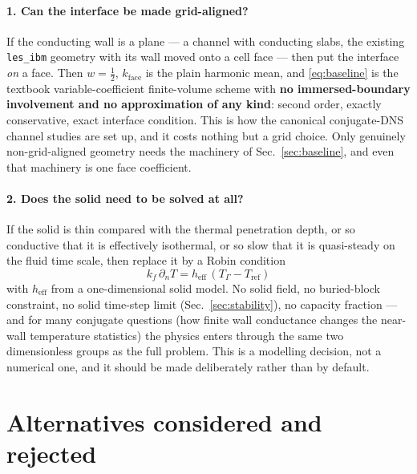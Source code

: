 \documentclass[11pt,a4paper]{article}
\newcommand{\code}[1]{\texttt{#1}}
\begin{document}
\paragraph{1. Can the interface be made grid-aligned?}
If the conducting wall is a plane --- a channel with conducting slabs, the
existing \code{les\_ibm} geometry with its wall moved onto a cell face --- then
put the interface \emph{on} a face. Then $w=\tfrac12$, $k_{\text{face}}$ is the
plain harmonic mean, and \eqref{eq:baseline} is the textbook variable-coefficient
finite-volume scheme with \textbf{no immersed-boundary involvement and no
approximation of any kind}: second order, exactly conservative, exact interface
condition. This is how the canonical conjugate-DNS channel studies are set up,
and it costs nothing but a grid choice. Only genuinely non-grid-aligned geometry
needs the machinery of Sec.~\ref{sec:baseline}, and even that machinery is one
face coefficient.

\paragraph{2. Does the solid need to be solved at all?}
If the solid is thin compared with the thermal penetration depth, or so
conductive that it is effectively isothermal, or so slow that it is quasi-steady
on the fluid time scale, then replace it by a Robin condition
\begin{equation}
  k_f\,\partial_nT = h_{\text{eff}}\,(T_\Gamma-T_{\text{ref}})
\end{equation}
with $h_{\text{eff}}$ from a one-dimensional solid model. No solid field, no
buried-block constraint, no solid time-step limit
(Sec.~\ref{sec:stability}), no capacity fraction --- and for many conjugate
questions (how finite wall conductance changes the near-wall temperature
statistics) the physics enters through the same two dimensionless groups as the
full problem. This is a modelling decision, not a numerical one, and it should
be made deliberately rather than by default.

\section{Alternatives considered and rejected}
\end{document}
